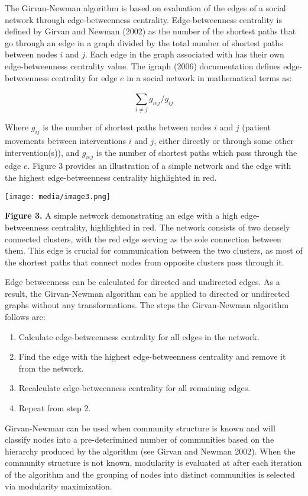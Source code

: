 The Girvan-Newman algorithm is based on evaluation of the edges of a
social network through edge-betweenness centrality. Edge-betweenness
centrality is defined by Girvan and Newman (2002) as the number of the
shortest paths that go through an edge in a graph divided by the total
number of shortest paths between nodes \(i\) and \(j\). Each edge in the
graph associated with has their own edge-betweenness centrality value.
The igraph (2006) documentation defines edge-betweenness centrality for
edge \(e\) in a social network in mathematical terms as:

\[\sum_{i \neq j}^{}g_{iej}/g_{ij}\]

Where \(g_{ij}\) is the number of shortest paths between nodes \(i\) and
\(j\) (patient movements between interventions \(i\) and \(j\), either
directly or through some other intervention(s)), and \(g_{iej}\) is the
number of shortest paths which pass through the edge \(e\). Figure 3
provides an illustration of a simple network and the edge with the
highest edge-betweenness centrality highlighted in red.

\texttt{[image: media/image3.png]}

\textbf{Figure 3.} A simple network demonstrating an edge with a high
edge-betweenness centrality, highlighted in red. The network consists of
two densely connected clusters, with the red edge serving as the sole
connection between them. This edge is crucial for communication between
the two clusters, as most of the shortest paths that connect nodes from
opposite clusters pass through it.

Edge betweenness can be calculated for directed and undirected edges. As
a result, the Girvan-Newman algorithm can be applied to directed or
undirected graphs without any transformations. The steps the
Girvan-Newman algorithm follows are:

\begin{enumerate}
\def\labelenumi{\arabic{enumi}.}
\item
  Calculate edge-betweenness centrality for all edges in the network.
\item
  Find the edge with the highest edge-betweenness centrality and remove
  it from the network.
\item
  Recalculate edge-betweenness centrality for all remaining edges.
\item
  Repeat from step 2.
\end{enumerate}

Girvan-Newman can be used when community structure is known and will
classify nodes into a pre-deterimined number of communities based on the
hierarchy produced by the algorithm (see Girvan and Newman 2002). When
the community structure is not known, modularity is evaluated at after
each iteration of the algorithm and the grouping of nodes into distinct
communities is selected via modularity maximization.

